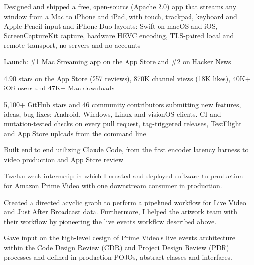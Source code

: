 \documentclass[letterpaper]{deedy-resume} %
\begin{document}
\begin{minipage}[t]{0.66\textwidth}
\begin{tightitemize}
\item Designed and shipped a free, open-source (Apache 2.0) app that streams any window from a Mac to iPhone and iPad, with touch, trackpad, keyboard and Apple Pencil input and iPhone Duo layouts: Swift on macOS and iOS, ScreenCaptureKit capture, hardware HEVC encoding, TLS-paired local and remote transport, no servers and no accounts
\item Launch: \#1 Mac Streaming app on the App Store and \#2 on Hacker News
\item 4.90 stars on the App Store (257 reviews), 870K channel views (18K likes), 40K+ iOS users and 47K+ Mac downloads
\item 5,100+ GitHub stars and 46 community contributors submitting new features, ideas, bug fixes; Android, Windows, Linux and visionOS clients. CI and mutation-tested checks on every pull request, tag-triggered releases, TestFlight and App Store uploads from the command line
\item Built end to end utilizing Claude Code, from the first encoder latency harness to video production and App Store review
\end{tightitemize}
\vspace{\topsep}


\begin{tightitemize}
\item Twelve week internship in which I created and deployed software to production for Amazon Prime Video with one downstream consumer in production.
\item Created a directed acyclic graph to perform a pipelined workflow for Live Video and Just After Broadcast data. Furthermore, I helped the artwork team with their workflow by pioneering the live events workflow described above.
\item Gave input on the high-level design of Prime Video's live events architecture within the Code Design Review (CDR) and Project Design Review (PDR) processes and defined in-production POJOs, abstract classes and interfaces.
\end{tightitemize}

\end{minipage} %
\end{document}
